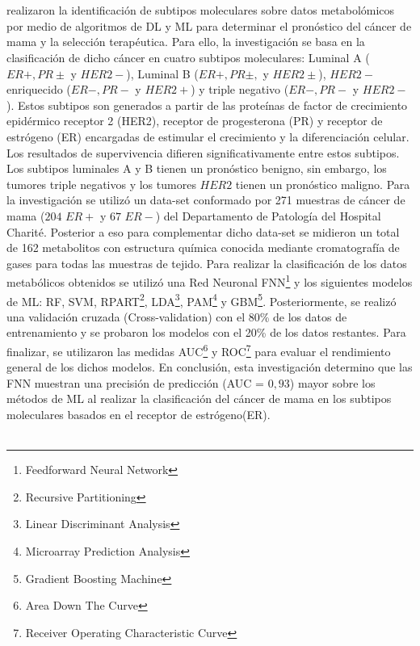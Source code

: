 \\\\
\cite{Alakwaa2018} realizaron la identificación de subtipos moleculares sobre datos metabolómicos por medio de algoritmos de DL y ML para determinar el pronóstico del cáncer de mama y la selección terapéutica. Para ello, la investigación se basa en la clasificación de dicho cáncer en cuatro subtipos moleculares: Luminal A ($ER +, PR \pm$ y $HER2-$), Luminal B ($ER +, PR \pm,$ y $HER2\pm$), $HER2-$ enriquecido ($ER-, PR-$ y $HER2 +$) y triple negativo ($ER-, PR-$ y $HER2 -$). Estos subtipos son generados a partir de las proteínas de factor de crecimiento epidérmico receptor 2 (HER2), receptor de progesterona (PR) y receptor de estrógeno (ER) encargadas de estimular el crecimiento y la diferenciación celular. Los resultados de supervivencia difieren significativamente entre estos subtipos. Los subtipos luminales A y B tienen un pronóstico benigno, sin embargo, los tumores triple negativos y los tumores $HER2$ tienen un pronóstico maligno. Para la investigación se utilizó un data-set conformado por 271 muestras de cáncer de mama ($204$ $ER+ $ y $67$ $ER- $) del Departamento de Patología del Hospital Charité. Posterior a eso para complementar dicho data-set se midieron un total de 162 metabolitos con estructura química conocida mediante cromatografía de gases para todas las muestras de tejido. Para realizar la clasificación de los datos metabólicos obtenidos se utilizó una Red Neuronal FNN\footnote{Feedforward Neural Network} y los siguientes modelos de ML: RF, SVM, RPART\footnote{Recursive Partitioning}, LDA\footnote{Linear Discriminant Analysis}, PAM\footnote{Microarray Prediction Analysis} y GBM\footnote{Gradient Boosting Machine}. Posteriormente, se realizó una validación cruzada (Cross-validation) con el 80\% de los datos de entrenamiento y se probaron los modelos con el 20\% de los datos restantes. Para finalizar, se utilizaron las medidas AUC\footnote{Area Down The Curve} y ROC\footnote{Receiver Operating Characteristic Curve} para evaluar el rendimiento general de los dichos modelos. En conclusión, esta investigación determino que las FNN muestran una precisión de predicción (AUC = $0,93$) mayor sobre los métodos de ML al realizar la clasificación del cáncer de mama en los subtipos moleculares basados en el receptor de estrógeno(ER).
\\\\
